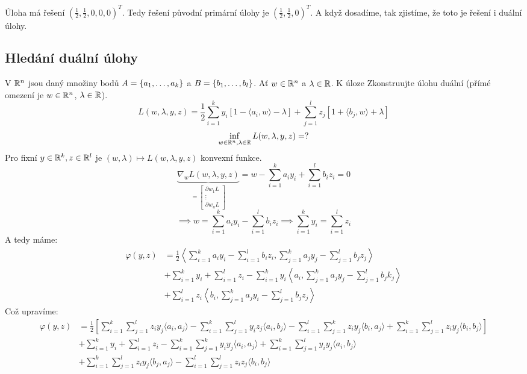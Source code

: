 Úloha má řešení $\left(\frac{1}{2}, \frac{1}{2}, 0, 0, 0 \right)^T$. Tedy řešení původní primární úlohy je 
$\left(\frac{1}{2}, \frac{1}{2}, 0\right)^T$. A když dosadíme, tak zjistíme, že toto je řešení i duální úlohy.

\subsection{Hledání duální úlohy}
V $\mathbb{R}^n$ jsou daný množiny bodů $A = \left\lbrace a_1, \dots, a_k \right\rbrace$ a $B = \left\lbrace b_1, \dots, b_l \right\rbrace$. Ať $w \in \mathbb{R}^n$ a 
$\lambda \in \mathbb{R}$. K úloze
Zkonstruujte úlohu duální (přímé omezení je $w \in \mathbb{R}^n$, $\lambda \in \mathbb{R}$).
\[
    L(w, \lambda, y, z) = \frac{1}{2} \sum_{i=1}^{k}y_i \left[1-\langle a_i, w\rangle - \lambda\right] +
    \sum_{j=1}^{l}z_j \left[1+ \langle b_j, w\rangle + \lambda\right]
\]
\[
    \inf_{w \in \mathbb{R}^n, \lambda \in \mathbb{R}} L(w, \lambda, y, z) = ?
\]
Pro fixní $y \in \mathbb{R}^k, z \in \mathbb{R}^l$ je $(w, \lambda) \mapsto L(w, \lambda, y, z)$ konvexní funkce.
\[
    \underbrace{\nabla_w L(w, \lambda, y, z)}_{= \begin{bmatrix} \partial w_1 L \\ \vdots \\ \partial w_u L\end{bmatrix}} 
    = w - \sum_{i=1}^{k}a_iy_i + \sum_{i=1}^{l}b_i z_i = 0
\]
\[
    \implies w = \sum_{i=1}^{k} a_i y_i - \sum_{i=1}^{l}b_i z_i \implies \sum_{i=1}^{k}y_i = \sum_{i=1}^{l}z_i
\]
A tedy máme:
\begin{align}
    \varphi(y, z) &= \frac{1}{2} \left\langle \sum_{i=1}^{k}a_i y_i - \sum_{i=1}^{l}b_i z_i, 
    \sum_{j=1}^{k}a_j y_j - \sum_{j=1}^{l}b_j z_j \right\rangle \\
    &+ \sum_{i=1}^{k}y_i + \sum_{i=1}^{l}z_i - \sum_{i=1}^{k}y_i 
    \left\langle a_i, \sum_{j=1}^{k}a_j y_j - \sum_{j=1}^{l}b_jk_j\right\rangle\\
    &+ \sum_{i=1}^{l}z_i \left\langle b_i, \sum_{j=1}^{k}a_j y_i - \sum_{j=1}^{l}b_j z_j\right\rangle
\end{align}
Což upravíme:
\begin{align}
    \varphi(y, z) &= \frac{1}{2} \left[
       \sum_{i=1}^{k} \sum_{j=1}^{l} z_i y_j \langle a_i, a_j \rangle
     - \sum_{i=1}^{k} \sum_{j=1}^{l} y_i z_j \langle a_i, b_j \rangle
     - \sum_{i=1}^{l} \sum_{j=1}^{k} z_i y_j \langle b_i, a_j \rangle
     + \sum_{i=1}^{k} \sum_{j=1}^{l} z_i y_j \langle b_i, b_j \rangle
    \right] \\
    &+ \sum_{i=1}^{k} y_i + \sum_{i=1}^{l} z_i
     - \sum_{i=1}^{k} \sum_{j=1}^{k} y_i y_j \langle a_i, a_j \rangle
     + \sum_{i=1}^{k} \sum_{j=1}^{l} y_i y_j \langle a_i, b_j \rangle \\
    &+ \sum_{i=1}^{k} \sum_{j=1}^{l} z_i y_j \langle b_j, a_j \rangle
     - \sum_{i=1}^{l} \sum_{j=1}^{l} z_i z_j \langle b_i, b_j \rangle
\end{align}
